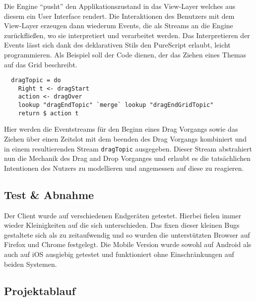 \noindent Die Engine ``pusht'' den Applikationszustand in das
View-Layer welches aus diesem ein User Interface rendert.
Die Interaktionen des Benutzers mit dem View-Layer erzeugen dann
wiederum Events, die als Streams an die Engine zurückfließen, wo sie
interpretiert und verarbeitet werden. Das Interpretieren der Events
lässt sich dank des deklarativen Stils den PureScript erlaubt, leicht
programmieren. Als Beispiel soll der Code dienen, der das Ziehen eines
Themas auf das Grid beschreibt.

\begin{lstlisting}
  dragTopic = do
    Right t <- dragStart
    action <- dragOver
    lookup "dragEndTopic" `merge` lookup "dragEndGridTopic"
    return $ action t
\end{lstlisting}
\noindent Hier werden die Eventstreams für den Beginn eines
Drag Vorgangs sowie das Ziehen über einen Zeitslot mit dem beenden des
Drag Vorgangs kombiniert und in einem resultierenden Stream \texttt{dragTopic}
ausgegeben. Dieser Stream abstrahiert nun die Mechanik des Drag and
Drop Vorganges und erlaubt es die tatsächlichen Intentionen des
Nutzers zu modellieren und angemessen auf diese zu reagieren.
\subsection{Test \& Abnahme}
Der Client wurde auf verschiedenen Endgeräten getestet. Hierbei fielen
immer wieder Kleinigkeiten auf die sich unterschieden. Das fixen
dieser kleinen Bugs gestaltete sich als zu zeitaufwendig und so wurden
die unterstützten Browser auf Firefox und Chrome festgelegt.
Die Mobile Version wurde sowohl auf Android als auch auf iOS ausgiebig
getestet und funktioniert ohne Einschränkungen auf beiden Systemen.
\subsection{Projektablauf}

